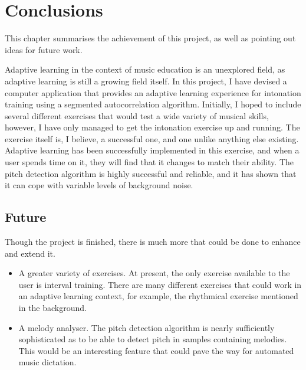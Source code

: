 \chapter{Conclusions}
This chapter summarises the achievement of this project, as well as pointing out ideas for future work.

Adaptive learning in the context of music education is an unexplored field, as adaptive learning is still a growing field itself. In this project, I have devised a computer application that provides an adaptive learning experience for intonation training using a segmented autocorrelation algorithm. 
Initially, I hoped to include several different exercises that would test a wide variety of musical skills, however, I have only managed to get the intonation exercise up and running.
The exercise itself is, I believe, a successful one, and one unlike anything else existing. 
Adaptive learning has been successfully implemented in this exercise, and when a user spends time on it, they will find that it changes to match their ability.
The pitch detection algorithm is highly successful and reliable, and it has shown that it can cope with variable levels of background noise.



\section{Future}
Though the project is finished, there is much more that could be done to enhance and extend it. \begin{itemize}
	\item A greater variety of exercises. At present, the only exercise available to the user is interval training. There are many different exercises that could work in an adaptive learning context, for example, the rhythmical exercise mentioned in the background.
	\item A melody analyser. The pitch detection algorithm is nearly sufficiently sophisticated as to be able to detect pitch in samples containing melodies. This would be an interesting feature that could pave the way for automated music dictation.

\end{itemize}